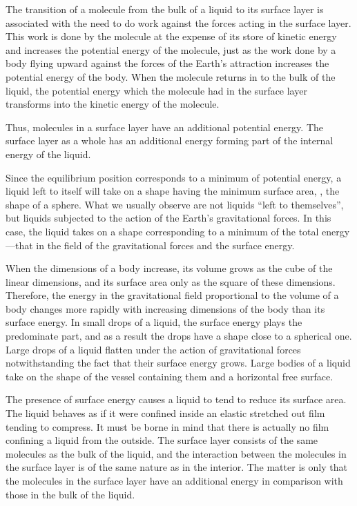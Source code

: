 The transition of a molecule from the bulk of a liquid to its surface layer is associated with the need to do work against the forces acting in the surface layer. This work is done by the molecule at the expense of its store of kinetic energy and increases the potential energy of the molecule, just as the work done by a body flying upward against the forces of the Earth's attraction increases the potential energy of the body. When the molecule returns in to the bulk of the liquid, the potential energy which the molecule had in the surface layer transforms into the kinetic energy of the molecule.

Thus, molecules in a surface layer have an additional potential energy. The surface layer as a whole has an additional energy forming part of the internal energy of the liquid. 

Since the equilibrium position corresponds to a minimum of potential energy, a liquid left to itself will take on a shape having the minimum surface area, \ie, the shape of a sphere. What we usually observe are not liquids ``left to themselves'', but liquids subjected to the action of the Earth's gravitational forces. In this case, the liquid takes on a shape corresponding to a minimum of the total energy---that in the field of the gravitational forces and the surface energy.

When the dimensions of a body increase, its volume grows as the cube of the linear dimensions, and its surface area only as the square of these dimensions. Therefore, the energy in the gravitational field proportional to the volume of a body changes more rapidly with increasing dimensions of the body than its surface energy. In small drops of a liquid, the surface energy plays the predominate part, and as a result the drops have a shape close to a spherical one. Large drops of a liquid flatten under the action of gravitational forces notwithstanding the fact that their surface energy grows. Large bodies of a liquid take on the shape of the vessel containing them and a horizontal free surface.

The presence of surface energy causes a liquid to tend to reduce its surface area. The liquid behaves as if it were confined inside an elastic stretched out film tending to compress. It must be borne in mind that there is actually no film confining a liquid from the outside. The surface layer consists of the same molecules as the bulk of the liquid, and the interaction between the molecules in the surface layer is of the same nature as in the interior. The matter is only that the molecules in the surface layer have an additional energy in comparison with those in the bulk of the liquid.

